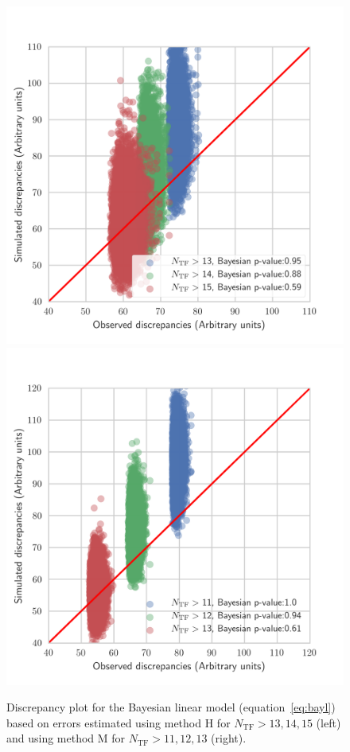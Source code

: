 \documentclass[a4paper,fleqn,usenatbib]{mnras}
\begin{document}
\begin{figure}
	\includegraphics[scale=0.69]{f14discl.png}
	\includegraphics[scale=0.69]{f15discl2.png}
    \caption{Discrepancy plot for the Bayesian linear model (equation~\ref{eq:bayl}) based on errors estimated using method H for $N_\mathrm{TF}>13,14,15$ (left) and using method M for $N_\mathrm{TF}>11,12,13$ (right). }
    \label{fig:discl}
\end{figure}
\end{document}
